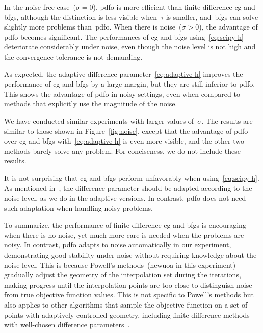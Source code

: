 \documentclass[smallextended]{svjour3}
\newcommand{\modified}[1]{#1}
\begin{document}
In the noise-free case~($\sigma = 0$), \gls{pdfo} is more efficient than finite-difference \gls{cg} and \gls{bfgs}, although the distinction is less visible when~$\tau$ is smaller, and~\gls{bfgs} can solve slightly more problems than~\gls{pdfo}.
When there is noise~($\sigma >0$), the advantage of \gls{pdfo} becomes significant.
The performances of \gls{cg} and \gls{bfgs} \modified{using~\eqref{eq:scipy-h}} deteriorate considerably under noise, even \modified{though} the noise level is not high and the convergence tolerance is not demanding.
\modified{
    As expected, the adaptive difference parameter~\eqref{eq:adaptive-h} improves the performance of \gls{cg} and \gls{bfgs} by a large margin, but they are still inferior to \gls{pdfo}.
    This shows the advantage of \gls{pdfo} in noisy settings, even when compared to methods that explicitly use the magnitude of the noise.
}
    We have conducted similar experiments with larger values of~$\sigma$.
    The results are similar to those shown in Figure~\ref{fig:noise}, except that the advantage of \gls{pdfo} over \gls{cg} and \gls{bfgs} with~\eqref{eq:adaptive-h} is even more visible, and the other two methods barely solve any problem.
    For conciseness, we do not include these results.

\modified{
    It is not surprising that \gls{cg} and \gls{bfgs} perform unfavorably when using~\eqref{eq:scipy-h}.
    As mentioned in~\cite{More_Wild_2012,Shi_Etal_2022a,Shi_Etal_2023}, the difference parameter \modified{should} be adapted according to the noise level, as we do in the adaptive versions.
    In contrast, \gls{pdfo} does not need such adaptation when handling noisy problems.
}

To summarize, the performance of finite-difference \gls{cg} and \gls{bfgs} is encouraging when there is no noise, yet much more care is needed when the problems are noisy.
In contrast, \gls{pdfo} adapts to noise automatically in our experiment, demonstrating good stability under noise without requiring knowledge about the noise level.
This is because Powell's methods~(\gls{newuoa} in this experiment) gradually adjust the geometry of the interpolation set during the iterations, making progress until the interpolation points are too close to distinguish noise from true objective function values.
This is not specific to Powell's methods but also applies to other algorithms that sample the objective function on a set of points with adaptively controlled geometry, including finite-difference methods with well-chosen difference parameters~\cite{Shi_Etal_2022a}.
\end{document}
